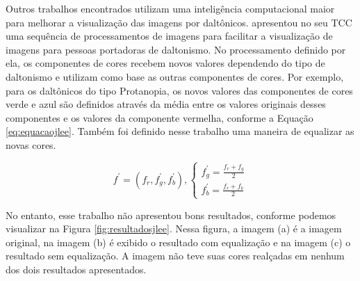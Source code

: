 \documentclass[	12pt, Times, openright, twoside, a4paper, english, brazil]{abntex2}
\begin{document}
Outros trabalhos encontrados utilizam uma inteligência computacional maior para melhorar a visualização das imagens por daltônicos.  apresentou no seu TCC uma sequência de processamentos de imagens para facilitar a visualização de imagens para pessoas portadoras de daltonismo. No processamento definido por ela, os componentes de cores recebem novos valores dependendo do tipo de daltonismo e utilizam como base as outras componentes de cores. Por exemplo, para os daltônicos do tipo Protanopia, os novos valores das componentes de cores verde e azul são definidos através da média entre os valores originais desses componentes e os valores da componente vermelha, conforme a Equação \ref{eq:equacaojlee}. Também foi definido nesse trabalho uma maneira de equalizar as novas cores.

\begin{equation}
f^\prime =  (f_r, f_g^\prime, f_b^\prime), \left\{\begin{array}{rc}
f_g^\prime = \frac{f_r + f_g}{2}\\
f_b^\prime = \frac{f_r + f_b}{2}
\end{array}\right.
\label{eq:equacaojlee}
\end{equation}

No entanto, esse trabalho não apresentou bons resultados, conforme podemos visualizar na Figura \ref{fig:resultadosjlee}. Nessa figura, a imagem (a) é a imagem original, na imagem (b) é exibido o resultado com equalização e na imagem (c) o resultado sem equalização. A imagem não teve suas cores realçadas em nenhum dos dois resultados apresentados.
\end{document}
